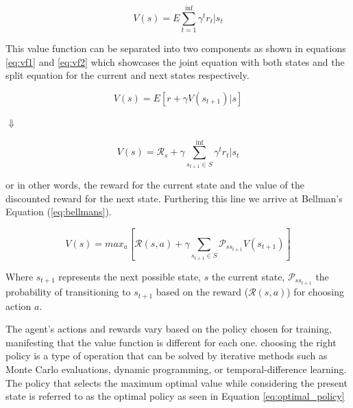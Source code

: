 \begin{equation}
    \label{eq:value_function}
    V(s) = E \sum_{t=1}^{\inf}\gamma^t r_t|s_t
\end{equation}

This value function can be separated into two components as shown in equations \ref{eq:vf1} and \ref{eq:vf2} which showcases the joint equation with both states and the split equation for the current and next states respectively.

\begin{equation}
    \label{eq:vf1}
    V(s) = E [r + \gamma V(s_{t+1})|s]
\end{equation}

\begin{center}
    $\Downarrow$
\end{center}

\begin{equation}
    \label{eq:vf2}
    V(s) = \mathcal{R}_s + \gamma \sum_{s_{t+1} \in S}^{\inf}\gamma^t r_t|s_t
\end{equation}


or in other words, the reward for the current state and the value of the discounted reward for the next state. Furthering this line we arrive at  Bellman's Equation (\ref{eq:bellmans}).

\begin{equation}
    \label{eq:bellmans}
    V(s) = max_a[ \mathcal{R}(s,a) + \gamma \sum_{s_{t+1} \in  S}\mathcal{P}_{ss_{t+1}} V(s_{t+1})]
\end{equation}

Where $s_{t+1}$ represents the next possible state, $s$ the current state, $\mathcal{P}_{ss_{t+1}}$ the probability of transitioning to $s_{t+1}$  based on the reward ($\mathcal{R}(s,a)$) for choosing action $a$.

The agent's actions and rewards vary based on the policy chosen for training, manifesting that the value function is different for each one. choosing the right policy is a type of operation that can be solved by iterative methods such as Monte Carlo evaluations, dynamic programming, or temporal-difference learning. The policy that selects the maximum optimal value while considering the present state is referred to as the optimal policy as seen in Equation \ref{eq:optimal_policy}

